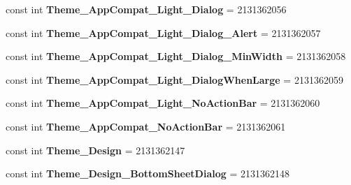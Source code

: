\begin{DoxyCompactItemize}
const int {\bfseries Theme\+\_\+\+App\+Compat\+\_\+\+Light\+\_\+\+Dialog} = 2131362056
\item 
\mbox{\label{class_pinned_app_1_1_droid_1_1_resource_1_1_style_ae846cb8c0b68d61a545cf3b887c50b88}} 
const int {\bfseries Theme\+\_\+\+App\+Compat\+\_\+\+Light\+\_\+\+Dialog\+\_\+\+Alert} = 2131362057
\item 
\mbox{\label{class_pinned_app_1_1_droid_1_1_resource_1_1_style_a7a953975c9cb45f5cfa30b73e9ba36da}} 
const int {\bfseries Theme\+\_\+\+App\+Compat\+\_\+\+Light\+\_\+\+Dialog\+\_\+\+Min\+Width} = 2131362058
\item 
\mbox{\label{class_pinned_app_1_1_droid_1_1_resource_1_1_style_a9d169455977f4f2aaef3d56006eb7ee2}} 
const int {\bfseries Theme\+\_\+\+App\+Compat\+\_\+\+Light\+\_\+\+Dialog\+When\+Large} = 2131362059
\item 
\mbox{\label{class_pinned_app_1_1_droid_1_1_resource_1_1_style_a2d2903f42ad7284eb81f68be292c2af7}} 
const int {\bfseries Theme\+\_\+\+App\+Compat\+\_\+\+Light\+\_\+\+No\+Action\+Bar} = 2131362060
\item 
\mbox{\label{class_pinned_app_1_1_droid_1_1_resource_1_1_style_aa1b2f3e46758462107563f51fbfaf435}} 
const int {\bfseries Theme\+\_\+\+App\+Compat\+\_\+\+No\+Action\+Bar} = 2131362061
\item 
\mbox{\label{class_pinned_app_1_1_droid_1_1_resource_1_1_style_aaa5db58dc1021bd65ca8c444d85fd78a}} 
const int {\bfseries Theme\+\_\+\+Design} = 2131362147
\item 
\mbox{\label{class_pinned_app_1_1_droid_1_1_resource_1_1_style_a7e8c5f313cc8b32d5b464ae4cca5b200}} 
const int {\bfseries Theme\+\_\+\+Design\+\_\+\+Bottom\+Sheet\+Dialog} = 2131362148
\item 
\mbox{\label{class_pinned_app_1_1_droid_1_1_resource_1_1_style_a75d5d9e070befdecdb5beec861ad005b}} 

\end{DoxyCompactItemize}
